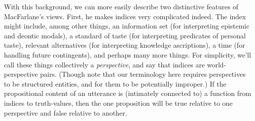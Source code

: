 \documentclass[
  10pt,
  letterpaper,
  DIV=11,
  numbers=noendperiod,
  twoside]{scrartcl}
\begin{document}
With this background, we can more easily describe two distinctive
features of MacFarlane's views. First, he makes indices very complicated
indeed. The index might include, among other things, an information set
(for interpreting epistemic and deontic modals), a standard of taste
(for interpreting predicates of personal taste), relevant alternatives
(for interpreting knowledge ascriptions), a time (for handling future
contingents), and perhaps many more things. For simplicity, we'll call
these things collectively a \emph{perspective}, and say that indices are
world-perspective pairs. (Though note that our terminology here requires
perspectives to be structured entities, and for them to be potentially
improper.) If the propositional content of an utterance is (intimately
connected to) a function from indices to truth-values, then the one
proposition will be true relative to one perspective and false relative
to another.
\end{document}
